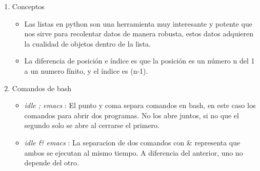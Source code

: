 \documentclass{book}
\begin{document}
\begin{enumerate}
	\item Conceptos
	\begin{itemize}
		\item Las listas en python son una herramienta muy interesante y potente que nos sirve para recolentar datos de manera robusta, estos datos adquieren la cualidad de objetos dentro de la lista.
		\item La diferencia de posición e índice es que la posición es un número n del 1 a un numero fínito, y el índice es (n-1).
	\end{itemize}
	
	\item Comandos de bash
	\begin{itemize}
		\item {\textit{idle ; emacs} }: El punto y coma separa comandos en bash, en este caso los comandos para abrir dos programas. No los abre juntos, si no que el segundo solo se abre al cerrarse el primero.
		\item {\textit{idle \& emacs}} : La separacion de dos comandos con \& representa que ambos se ejecutan al mismo tiempo. A diferencia del anterior, uno no depende del otro.
	\end{itemize}
	

\end{enumerate}
\end{document}
